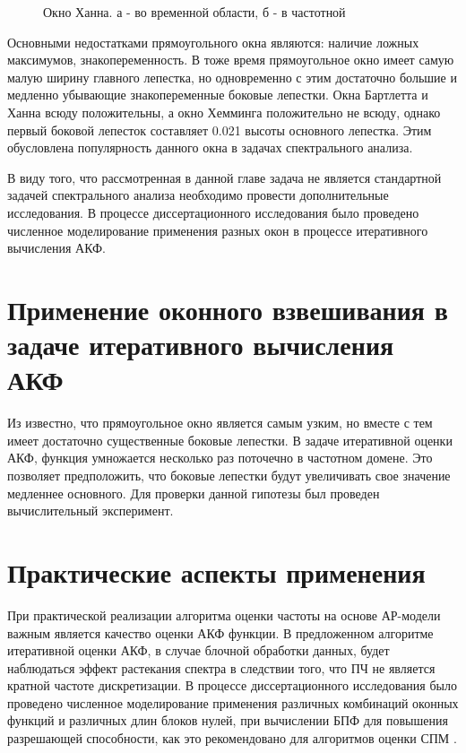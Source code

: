\begin{figure}[h]
	\center{}
	\caption{Окно Ханна. а - во временной области, б - в частотной}
	\label{pic:win_hann}
\end{figure}

Основными недостатками прямоугольного окна являются: наличие ложных максимумов, знакопеременность. В тоже время прямоугольное окно имеет самую малую ширину главного лепестка, но
одновременно с этим достаточно большие и медленно убывающие знакопеременные боковые лепестки. Окна Бартлетта и Ханна всюду положительны, а окно Хемминга положительно не всюду, однако
первый боковой лепесток составляет 0.021 высоты основного лепестка. Этим обусловлена популярность данного окна в задачах спектрального анализа.

В виду того, что рассмотренная в данной главе задача не является стандартной задачей спектрального анализа необходимо провести дополнительные исследования. В процессе
диссертационного исследования было проведено численное моделирование применения разных окон в процессе итеративного вычисления АКФ.

\section{Применение оконного взвешивания в задаче итеративного вычисления АКФ}

Из \cite{bolshakov-book} известно, что прямоугольное окно является самым узким, но вместе с тем имеет достаточно существенные боковые лепестки. В задаче итеративной оценки
АКФ, функция умножается несколько раз поточечно в частотном домене. Это позволяет предположить, что боковые лепестки будут увеличивать свое значение медленнее основного.
Для проверки данной гипотезы был проведен вычислительный эксперимент.

\section{Практические аспекты применения}
\label{lab:sec2_windows}

При практической реализации алгоритма оценки частоты на основе АР-модели важным является качество оценки АКФ функции. В предложенном алгоритме итеративной оценки АКФ,
в случае блочной обработки данных, будет наблюдаться эффект растекания спектра в следствии того, что ПЧ не является кратной частоте дискретизации. В процессе диссертационного
исследования было проведено численное моделирование применения различных комбинаций оконных функций и различных длин блоков нулей, при вычислении БПФ для повышения
разрешающей способности, как это рекомендовано для алгоритмов оценки СПМ \cite{bolshakov-book}.

